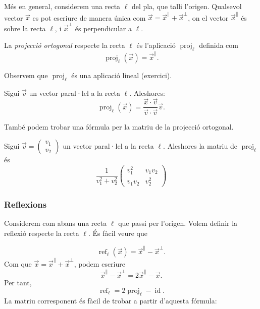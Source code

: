 Més en general, considerem una recta $\ell$ del pla, que talli l'origen. Qualsevol vector $\vec x$ es pot escriure de manera única com $\vec x = \vec x^{\parallel} + \vec x^{\perp}$, on el vector $\vec x^\parallel$ és sobre la recta $\ell$, i $\vec x^\perp$ és perpendicular a $\ell$.
\begin{definicio}
	La \emph{projecció ortogonal} respecte la recta $\ell$ és l'aplicació $\operatorname{proj}_\ell$ definida com
	\[
	\operatorname{proj}_\ell(\vec x) = \vec x^\parallel.
	\]
\end{definicio}

Observem que $\operatorname{proj}_\ell$ és una aplicació lineal (exercici).

\begin{proposicio}
	Sigui $\vec v$ un vector paral·lel a la recta $\ell$. Aleshores:
	\[
	\operatorname{proj}_\ell(\vec x) = \frac{\vec x\cdot \vec v}{\vec v\cdot \vec v} \vec v.
	\]
\end{proposicio}

També podem trobar una fórmula per la matriu de la projecció ortogonal.

\begin{proposicio}\label{prop:projR2}
	Sigui $\vec v = \begin{pmatrix}v_1\\v_2\end{pmatrix}$ un vector paral·lel a la recta $\ell$. Aleshores la matriu de $\operatorname{proj}_\ell$ és
	\[
	\frac{1}{v_1^2 + v_2^2}\begin{pmatrix}v_1^2&v_1v_2\\v_1v_2&v_2^2\end{pmatrix}
	\]
\end{proposicio}

\subsubsection{Reflexions}\label{subsubsec:reflexio}
Considerem com abans una recta $\ell$ que passi per l'origen. Volem definir la reflexió respecte la recta $\ell$. És fàcil veure que

\[
\operatorname{ref}_\ell(\vec x) = \vec x^\parallel - \vec x^\perp.
\]
Com que $\vec x = \vec x^\parallel + \vec x^\perp$, podem escriure
\[
\vec x^\parallel - \vec x^\perp = 2\vec x^\parallel - \vec x.
\]
Per tant,
\[
\operatorname{ref}_\ell = 2\operatorname{proj}_\ell - \operatorname{id}.
\]
La matriu corresponent és fàcil de trobar a partir d'aquesta fórmula:

